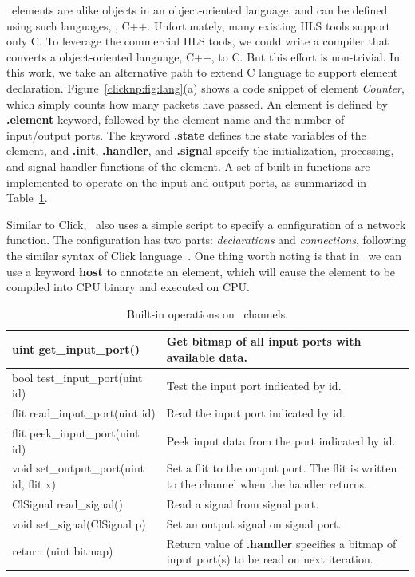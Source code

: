 \name\ elements are alike objects in an object-oriented language, and can be defined using such languages, \ie, C++.
Unfortunately, many existing HLS tools support only C. 
To leverage the commercial HLS tools, we could write a compiler that converts a object-oriented language, \eg C++, to C.
But this effort is non-trivial.
In this work, we take an alternative path to extend C language to support element declaration.
Figure~\ref{clicknp:fig:lang}(a) shows a code snippet of element \textit{Counter}, which simply counts how many packets have
passed. An element is defined by \textbf{.element} keyword, followed by the element name and the number of input/output ports.
The keyword \textbf{.state} defines the state variables of the element, and \textbf{.init}, \textbf{.handler}, and \textbf{.signal}
specify the initialization, processing, and signal handler functions of the element.
A set of built-in functions are implemented to operate on the input and output ports, as summarized in Table~\ref{clicknp:tab:built-in}.

Similar to Click, \name\ also uses a simple script to specify a configuration of a network function. The configuration has
two parts: \textit{declarations} and \textit{connections}, following the similar syntax of Click language~\cite{kohler2000click}.
One thing worth noting is that in \name\, we can use a keyword \textbf{host} to annotate an element, which will cause 
the element to be compiled into CPU binary and executed on CPU.

\begin{table}

\centering
\caption{Built-in operations on \name\ channels.}
\label{clicknp:tab:built-in}
\small
\begin{tabular}{p{}|p{}}
\toprule
uint get\_input\_port() & Get bitmap of all input ports with available data. \\
\midrule
bool test\_input\_port(uint id) & Test the input port indicated by id. \\
\midrule
flit read\_input\_port(uint id) & Read the input port indicated by id. \\
\midrule
flit peek\_input\_port(uint id) & Peek input data from the port indicated by id. \\
\midrule
void set\_output\_port(uint id, flit x) & Set a flit to the output port. The flit is written to the channel when the handler returns.\\
\midrule
ClSignal read\_signal() & Read a signal from signal port.\\
\midrule
void set\_signal(ClSignal p) & Set an output signal on signal port.\\
\midrule
return (uint bitmap) & Return value of \textbf{.handler} specifies a bitmap of input port(s) to be read on next iteration. \\
\bottomrule
\end{tabular}

\end{table}

